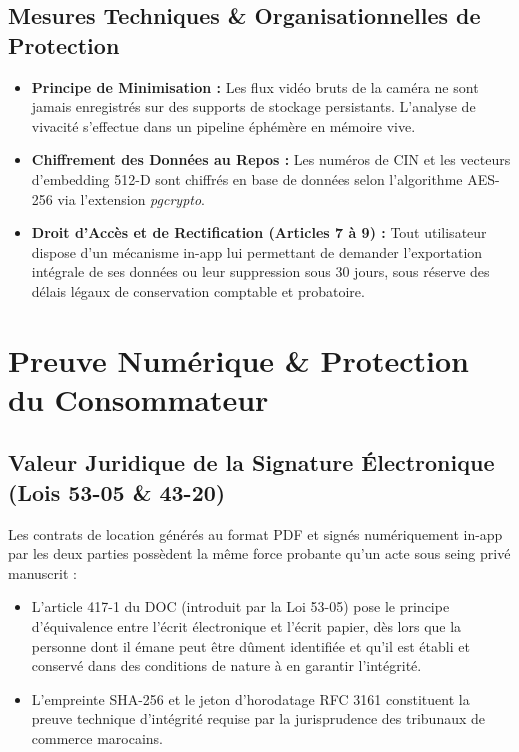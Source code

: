 \documentclass[11pt,a4paper]{report}
\begin{document}
\section{Mesures Techniques \& Organisationnelles de Protection}
\begin{itemize}[leftmargin=*]
    \item \textbf{Principe de Minimisation :} Les flux vidéo bruts de la caméra ne sont jamais enregistrés sur des supports de stockage persistants. L'analyse de vivacité s'effectue dans un pipeline éphémère en mémoire vive.
    \item \textbf{Chiffrement des Données au Repos :} Les numéros de CIN et les vecteurs d'embedding 512-D sont chiffrés en base de données selon l'algorithme AES-256 via l'extension \textit{pgcrypto}.
    \item \textbf{Droit d'Accès et de Rectification (Articles 7 à 9) :} Tout utilisateur dispose d'un mécanisme in-app lui permettant de demander l'exportation intégrale de ses données ou leur suppression sous 30 jours, sous réserve des délais légaux de conservation comptable et probatoire.
\end{itemize}

\chapter{Preuve Numérique \& Protection du Consommateur}

\section{Valeur Juridique de la Signature Électronique (Lois 53-05 \& 43-20)}
Les contrats de location générés au format PDF et signés numériquement in-app par les deux parties possèdent la même force probante qu'un acte sous seing privé manuscrit :
\begin{itemize}[leftmargin=*]
    \item L'article 417-1 du DOC (introduit par la Loi 53-05) pose le principe d'équivalence entre l'écrit électronique et l'écrit papier, dès lors que la personne dont il émane peut être dûment identifiée et qu'il est établi et conservé dans des conditions de nature à en garantir l'intégrité.
    \item L'empreinte SHA-256 et le jeton d'horodatage RFC 3161 constituent la preuve technique d'intégrité requise par la jurisprudence des tribunaux de commerce marocains.
\end{itemize}
\end{document}
